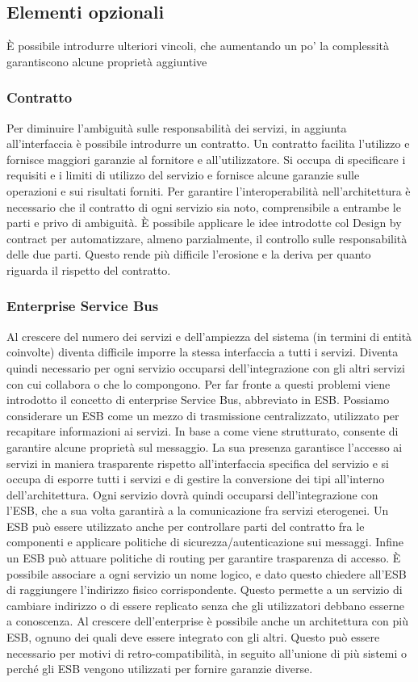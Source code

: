 \documentclass[12pt]{report}
\begin{document}
\subsection{Elementi opzionali} 
È possibile introdurre ulteriori vincoli, che aumentando un po' la complessità garantiscono alcune proprietà aggiuntive 
\subsubsection{Contratto}
Per diminuire l'ambiguità sulle responsabilità dei servizi, in aggiunta all'interfaccia è possibile introdurre un contratto.
Un contratto facilita l'utilizzo e fornisce maggiori garanzie al fornitore e all'utilizzatore.
Si occupa di specificare i requisiti e i limiti di utilizzo del servizio e fornisce alcune garanzie sulle operazioni e sui risultati forniti.
Per garantire l'interoperabilità nell'architettura è necessario che il contratto di ogni servizio sia noto, comprensibile a entrambe le parti e privo di ambiguità.
È possibile applicare le idee introdotte col Design by contract \cite{meyer1992applying} per automatizzare, almeno parzialmente, il controllo sulle responsabilità delle due parti. 
Questo rende più difficile l'erosione e la deriva per quanto riguarda il rispetto del contratto. 
\subsubsection{Enterprise Service Bus}
Al crescere del numero dei servizi e dell'ampiezza del sistema (in termini di entità coinvolte) diventa difficile imporre la stessa interfaccia a tutti i servizi.
Diventa quindi necessario per ogni servizio occuparsi dell'integrazione con gli altri servizi con cui collabora o che lo compongono.
Per far fronte a questi problemi viene introdotto il concetto di enterprise Service Bus, abbreviato in ESB. 
Possiamo considerare un ESB come un mezzo di trasmissione centralizzato, utilizzato per recapitare informazioni ai servizi. 
In base a come viene strutturato, consente di garantire alcune proprietà sul messaggio.
La sua presenza garantisce l'accesso ai servizi in maniera trasparente rispetto all'interfaccia specifica del servizio e si occupa di esporre tutti i servizi e di gestire la conversione dei tipi all'interno dell'architettura. 
Ogni servizio dovrà quindi occuparsi dell'integrazione con l'ESB, che a sua volta garantirà a la comunicazione fra servizi eterogenei.
Un ESB può essere utilizzato anche per controllare parti del contratto fra le componenti e applicare politiche di sicurezza/autenticazione sui messaggi.
Infine un ESB può attuare politiche di routing per garantire trasparenza di accesso. 
È possibile associare a ogni servizio un nome logico, e dato questo chiedere all'ESB
di raggiungere l'indirizzo fisico corrispondente.
Questo permette a un servizio di cambiare indirizzo o di essere replicato senza che gli utilizzatori debbano esserne a conoscenza. 
Al crescere dell'enterprise è possibile anche un architettura con più ESB, ognuno dei quali deve essere integrato con gli altri. 
Questo può essere necessario per motivi di retro-compatibilità, in seguito all'unione di più sistemi o perché gli ESB vengono utilizzati per fornire garanzie diverse.
\end{document}
